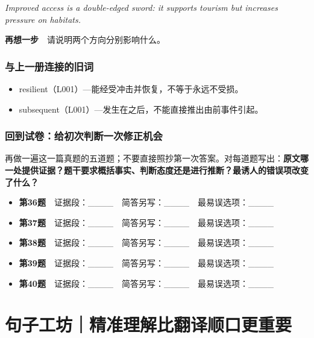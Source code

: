 \documentclass[
  11pt,
]{ctexart}
\renewenvironment{quote}{\begin{tcolorbox}[enhanced,breakable,colback=sand,colframe=primary!22,boxrule=0.4pt,arc=2pt,left=2.6mm,right=2.6mm,top=1.6mm,bottom=1.6mm]\itshape}{\end{tcolorbox}}
\begin{document}
\begin{quote}
Improved access is a double-edged sword: it supports tourism but
increases pressure on habitats.
\end{quote}

\textbf{再想一步}　请说明两个方向分别影响什么。

\subsubsection{与上一册连接的旧词}\label{ux4e0eux4e0aux4e00ux518cux8fdeux63a5ux7684ux65e7ux8bcd-1}

\begin{itemize}
\item
  resilient（L001）---能经受冲击并恢复，不等于永远不受损。
\item
  subsequent（L001）---发生在之后，不能直接推出由前事件引起。
\end{itemize}

\subsubsection{回到试卷：给初次判断一次修正机会}\label{ux56deux5230ux8bd5ux5377ux7ed9ux521dux6b21ux5224ux65adux4e00ux6b21ux4feeux6b63ux673aux4f1a-1}

再做一遍这一篇真题的五道题；不要直接照抄第一次答案。对每道题写出：\textbf{原文哪一处提供证据？题干要求概括事实、判断态度还是进行推断？最诱人的错误项改变了什么？}

\begin{itemize}
\item
  \textbf{第36题}　证据段：\_\_\_\_　简答另写：\_\_\_\_　最易误选项：\_\_\_\_
\item
  \textbf{第37题}　证据段：\_\_\_\_　简答另写：\_\_\_\_　最易误选项：\_\_\_\_
\item
  \textbf{第38题}　证据段：\_\_\_\_　简答另写：\_\_\_\_　最易误选项：\_\_\_\_
\item
  \textbf{第39题}　证据段：\_\_\_\_　简答另写：\_\_\_\_　最易误选项：\_\_\_\_
\item
  \textbf{第40题}　证据段：\_\_\_\_　简答另写：\_\_\_\_　最易误选项：\_\_\_\_
\end{itemize}

\section{句子工坊｜精准理解比翻译顺口更重要}\label{ux53e5ux5b50ux5de5ux574aux7cbeux51c6ux7406ux89e3ux6bd4ux7ffbux8bd1ux987aux53e3ux66f4ux91cdux8981}
\end{document}

